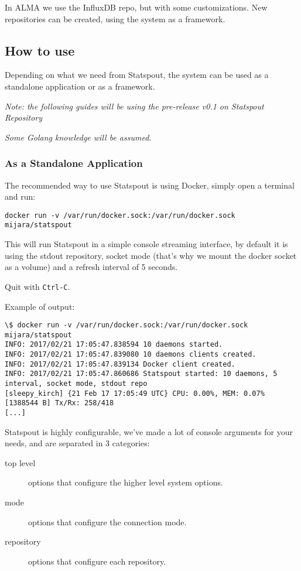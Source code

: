 In ALMA we use the InfluxDB repo, but with some customizations. New repositories can be created, using the system as a framework.

\subsection{How to use}

Depending on what we need from Statspout, the system can be used as a standalone application or as a framework.

\textit{Note: the following guides will be using the pre-release v0.1 on Statspout Repository \citep{statspout-github-0.1}}

\textit{Some Golang knowledge will be assumed. \citep{golang-website}}

\subsubsection{As a Standalone Application}

The recommended way to use Statspout is using Docker, simply open a terminal and run:

\begin{lstlisting}
docker run -v /var/run/docker.sock:/var/run/docker.sock mijara/statspout
\end{lstlisting}

This will run Statspout in a simple console streaming interface, by default it is using the stdout repository, socket mode (that's why we mount the docker socket as a volume) and a refresh interval of 5 seconds.

Quit with \texttt{Ctrl-C}.

Example of output:

\begin{lstlisting}
\$ docker run -v /var/run/docker.sock:/var/run/docker.sock mijara/statspout
INFO: 2017/02/21 17:05:47.838594 10 daemons started.
INFO: 2017/02/21 17:05:47.839080 10 daemons clients created.
INFO: 2017/02/21 17:05:47.839134 Docker client created.
INFO: 2017/02/21 17:05:47.860686 Statspout started: 10 daemons, 5 interval, socket mode, stdout repo
[sleepy_kirch] {21 Feb 17 17:05:49 UTC} CPU: 0.00%, MEM: 0.07% [1388544 B] Tx/Rx: 258/418
[...]
\end{lstlisting}

Statspout is highly configurable, we've made a lot of console arguments for your needs, and are separated in 3 categories:

\begin{description}
  \item[top level]
      options that configure the higher level system options.
      
  \item[mode]
      options that configure the connection mode.
      
  \item[repository]
      options that configure each repository.
\end{description}

